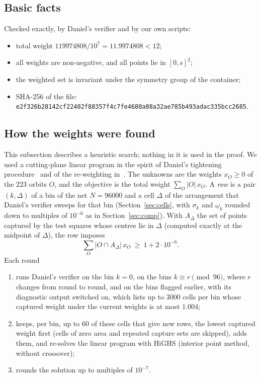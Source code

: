 \documentclass[11pt]{amsart}
\theoremstyle{definition}
\theoremstyle{remark}
\newcommand{\om}{\underline{\omega}}
\newcommand{\Wtot}{119974808}            %
\newcommand{\Wdec}{11.9974808}
\newcommand{\shahash}{e2f326b28142cf22402f88357f4c7fe4680a08a32ae785b493adac335bcc2685}
\begin{document}
\subsection*{Basic facts}
Checked exactly, by Daniel's verifier and by our own scripts:
\begin{itemize}
\item total weight $\Wtot/10^7=\Wdec<12$;
\item all weights are non-negative, and all points lie in $[0,s]^2$;
\item the weighted set is invariant under the symmetry group of the container;
\item SHA-256 of the file: {\footnotesize\texttt{\shahash}}.
\end{itemize}

\subsection{How the weights were found}\label{sec:howfound}
This subsection describes a heuristic search; nothing in it is used in the proof. We used a cutting-plane linear program in the spirit of Daniel's tightening procedure~\cite[\texttt{s12/search/TIGHTEN.md}]{Dan26} and of the re-weighting in~\cite{Lev26b}. The unknowns are the weights $x_O\ge0$ of the $223$ orbits $O$, and the objective is the total weight $\sum_O|O|\,x_O$. A \emph{row} is a pair $(k,\Delta)$ of a bin of the net $N=96000$ and a cell $\Delta$ of the arrangement that Daniel's verifier sweeps for that bin (Section~\ref{sec:cells}, with $\sigma_k$ and $\om_k$ rounded down to multiples of $10^{-6}$ as in Section~\ref{sec:comp}). With $A_\Delta$ the set of points captured by the test squares whose centres lie in $\Delta$ (computed exactly at the midpoint of $\Delta$), the row imposes
\[
  \sum_O |O\cap A_\Delta|\,x_O\ \ge\ 1+2\cdot10^{-6}.
\]
Each round
\begin{enumerate}
\item runs Daniel's verifier on the bin $k=0$, on the bins $k\equiv r\pmod{96}$, where $r$ changes from round to round, and on the bins flagged earlier, with its diagnostic output switched on, which lists up to $3000$ cells per bin whose captured weight under the current weights is at most $1.004$;
\item keeps, per bin, up to $60$ of these cells that give new rows, the lowest captured weight first (cells of zero area and repeated capture sets are skipped), adds them, and re-solves the linear program with HiGHS (interior point method, without crossover);
\item rounds the solution up to multiples of $10^{-7}$.
\end{enumerate}
\end{document}
